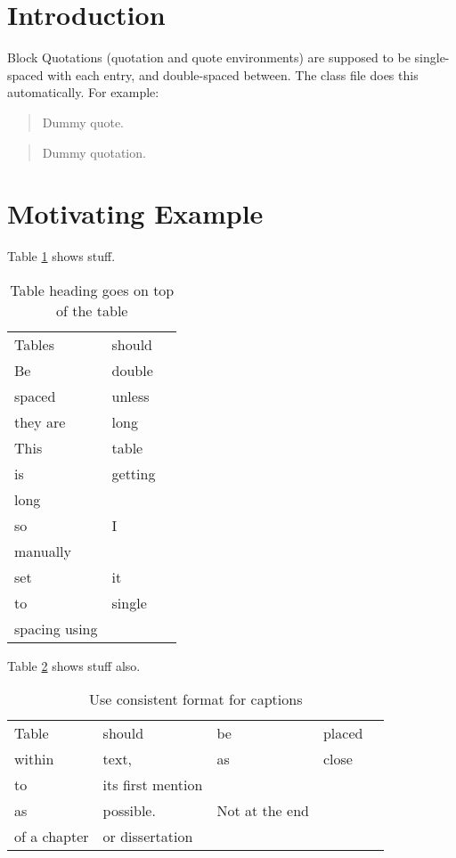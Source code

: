 \section{Introduction}
\label{section_intro}

Block Quotations (quotation and quote environments) are supposed to be
single-spaced with each entry, and double-spaced between. The class file does
this automatically. For example:
\begin{quote}
  Dummy quote. \blindtext
\end{quote}
\begin{quotation}
  Dummy quotation. \blindtext
\end{quotation}

\section{Motivating Example}
Table \ref{tab:label} shows stuff. \blindtext
\begin{table}[tp]
  \centering
  \caption[Table heading]{Table heading goes on top of the table}
  \label{tab:label}
  \renewcommand{\arraystretch}{1.2} %
  \begin{tabular}{@{}lll@{}}
    Tables & should \\
    Be & double\\
    spaced & unless & \\
    they are & long\\
    This & table\\
    is & getting\\
    long\\
    so & I\\
    manually\\
    set &it \\
    to & single\\
    spacing using
  \end{tabular}
\end{table}
Table \ref{tab:label2} shows stuff also.
\begin{table}[tp]
  \centering
  \caption{Use consistent format for captions}
  \label{tab:label2}
  \renewcommand{\arraystretch}{2} %
  \begin{tabular}{@{}lllll@{}}
    Table & should & be & placed\\
    within & text, & as & close\\
    to & its first mention\\
    as & possible. & Not at the end\\
    of a chapter & or dissertation
  \end{tabular}
\end{table}

\blindtext[2]

